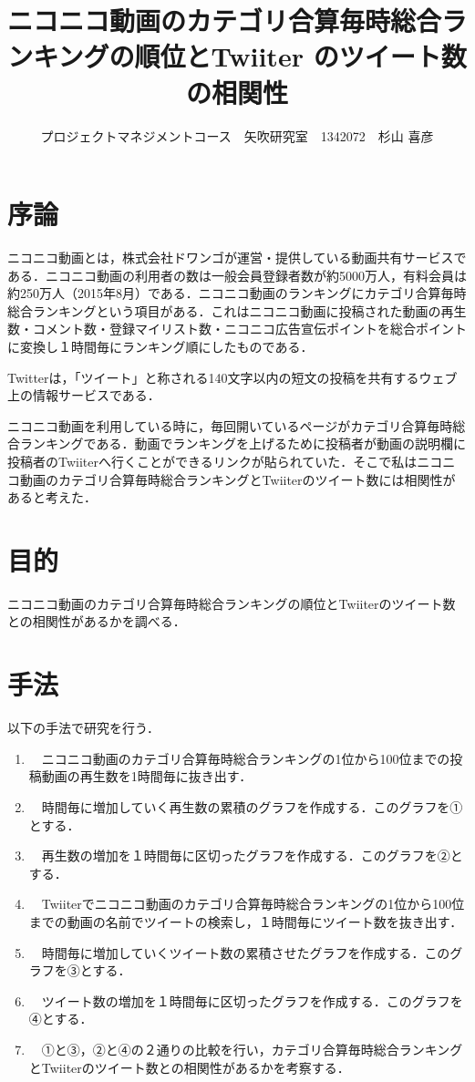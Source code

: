 \documentclass[uplatex,twocolumn,dvipdfmx]{jsarticle}
\title{\vspace{-5mm}\fontsize{14pt}{0pt}\selectfont ニコニコ動画のカテゴリ合算毎時総合ランキングの順位とTwiiter のツイート数の相関性}
\author{\normalsize プロジェクトマネジメントコース　矢吹研究室　1342072　杉山 喜彦}
\date{}
\begin{document}
\fontsize{10.5pt}{\baselineskip}\selectfont
\maketitle





\section{序論}

ニコニコ動画とは，株式会社ドワンゴが運営・提供している動画共有サービスである．ニコニコ動画の利用者の数は一般会員登録者数が約5000万人，有料会員は約250万人（2015年8月）である\cite{iii}．ニコニコ動画のランキングにカテゴリ合算毎時総合ランキングという項目がある．これはニコニコ動画に投稿された動画の再生数・コメント数・登録マイリスト数・ニコニコ広告宣伝ポイントを総合ポイントに変換し１時間毎にランキング順にしたものである．

Twitterは，「ツイート」と称される140文字以内の短文の投稿を共有するウェブ上の情報サービスである．

ニコニコ動画を利用している時に，毎回開いているページがカテゴリ合算毎時総合ランキングである．動画でランキングを上げるために投稿者が動画の説明欄に投稿者のTwiiterへ行くことができるリンクが貼られていた．そこで私はニコニコ動画のカテゴリ合算毎時総合ランキングとTwiiterのツイート数には相関性があると考えた．
\noindent

\section{目的}
ニコニコ動画のカテゴリ合算毎時総合ランキングの順位とTwiiterのツイート数との相関性があるかを調べる．
\section{手法}

以下の手法で研究を行う．

\begin{enumerate}

\item　ニコニコ動画のカテゴリ合算毎時総合ランキングの1位から100位までの投稿動画の再生数を1時間毎に抜き出す．
\item　時間毎に増加していく再生数の累積のグラフを作成する．このグラフを①とする．
\item　再生数の増加を１時間毎に区切ったグラフを作成する．このグラフを②とする．
\item　Twiiterでニコニコ動画のカテゴリ合算毎時総合ランキングの1位から100位までの動画の名前でツイートの検索し，１時間毎にツイート数を抜き出す．
\item　時間毎に増加していくツイート数の累積させたグラフを作成する．このグラフを③とする．
\item　ツイート数の増加を１時間毎に区切ったグラフを作成する．このグラフを④とする．
\item　①と③，②と④の２通りの比較を行い，カテゴリ合算毎時総合ランキングとTwiiterのツイート数との相関性があるかを考察する．

\end{enumerate}
\end{document}
